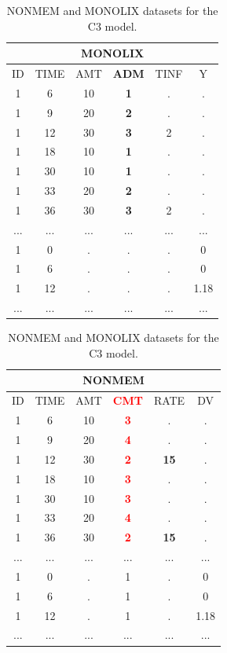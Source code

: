 \begin{table}[h!]
\footnotesize
\parbox{.5\linewidth}{
\centering
\begin{tabular}{cccccc}
  \hline
   \multicolumn{6}{c}{\textbf{MONOLIX}} \\
  \hline
ID	& TIME  & AMT	 & \textbf{ADM} &  TINF &	Y \\
  \hline
1	& 6	    & 10	& \textbf{1}	 & .	 & . \\
1	& 9	    & 20	& \textbf{2}	 & .	 & . \\
1	& 12	    & 30	& \textbf{3}	 & 2	 & . \\
1	& 18	    & 10	& \textbf{1}	 & .	 & . \\
1	& 30	    & 10	& \textbf{1}	 & .	 & . \\
1	& 33	    & 20	& \textbf{2}	 & .	 & . \\
1	& 36	    & 30	& \textbf{3}	 & 2	 & . \\
...     &  ...     &  ...     &  ...  & ...  & ... \\
1	& 0	    & .	& .	& .	& 0 \\
1	& 6	    & .	& .	& .	& 0 \\
1	& 12	    & .	& .	& .	& 1.18 \\
...     &  ...     &  ...     & ...  & ...  & ...\\
\end{tabular}
}
\hfill
\parbox{.5\linewidth}{
\centering
\begin{tabular}{cccccc}
  \hline
   \multicolumn{6}{c}{\textbf{NONMEM}} \\
  \hline
ID	& TIME  & AMT	 & \textbf{\textcolor{red}{CMT}} &  RATE &	DV \\
  \hline
1	& 6	    & 10	& \textbf{\textcolor{red}{3}}	 & .	 & . \\
1	& 9	    & 20	& \textbf{\textcolor{red}{4}}	 & .	 & . \\
1	& 12	    & 30	& \textbf{\textcolor{red}{2}}	 & \textbf{15}	 & . \\
1	& 18	    & 10	& \textbf{\textcolor{red}{3}}	 & .	 & . \\
1	& 30	    & 10	& \textbf{\textcolor{red}{3}}	 & .	 & . \\
1	& 33	    & 20	& \textbf{\textcolor{red}{4}}	 & .	 & . \\
1	& 36	    & 30	& \textbf{\textcolor{red}{2}}	 & \textbf{15}	 & . \\
...     &  ...     &  ...     &  ...  & ...  & ... \\
1	& 0	    & .	& 1	& .	& 0 \\
1	& 6	    & .	& 1	& .	& 0 \\
1	& 12	    & .	& 1	& .	& 1.18 \\
...     &  ...     &  ...     & ...  & ...  & ...\\
\end{tabular}
}
\caption{NONMEM and MONOLIX datasets for the C3 model.}
\end{table}

